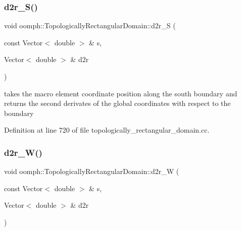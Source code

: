 \mbox{\label{classoomph_1_1TopologicallyRectangularDomain_ae3bc22aeb952c657f3b3672068243197}} 
\subsubsection{\texorpdfstring{d2r\+\_\+\+S()}{d2r\_S()}}
{\footnotesize\ttfamily void oomph\+::\+Topologically\+Rectangular\+Domain\+::d2r\+\_\+S (\begin{DoxyParamCaption}\item[{const Vector$<$ double $>$ \&}]{s,  }\item[{Vector$<$ double $>$ \&}]{d2r }\end{DoxyParamCaption})\hspace{0.3cm}{\ttfamily [private]}}



takes the macro element coordinate position along the south boundary and returns the second derivates of the global coordinates with respect to the boundary 



Definition at line 720 of file topologically\+\_\+rectangular\+\_\+domain.\+cc.

\mbox{\label{classoomph_1_1TopologicallyRectangularDomain_a4522f1751b8105bb7da4e1a14a75c05a}} 
\subsubsection{\texorpdfstring{d2r\+\_\+\+W()}{d2r\_W()}}
{\footnotesize\ttfamily void oomph\+::\+Topologically\+Rectangular\+Domain\+::d2r\+\_\+W (\begin{DoxyParamCaption}\item[{const Vector$<$ double $>$ \&}]{s,  }\item[{Vector$<$ double $>$ \&}]{d2r }\end{DoxyParamCaption})\hspace{0.3cm}{\ttfamily [private]}}



